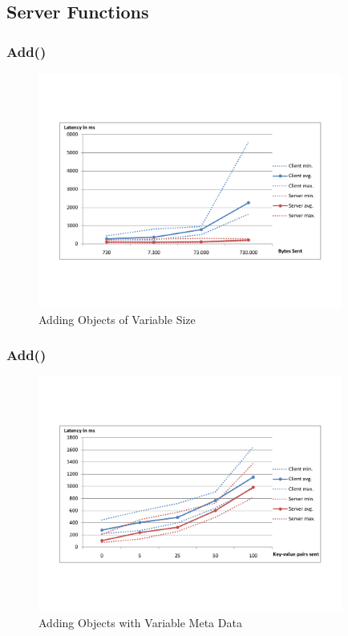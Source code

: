 \documentclass{beamer}
\begin{document}
\subsection{Server Functions}
\frame
{
	\frametitle{Add()}
	\begin{figure}[t]
	\begin{center}
	\includegraphics[trim = 0 5cm 0 5cm, width=10cm]{add_obj.pdf} 
	\caption{Adding Objects of Variable Size}
	\end{center}
	\end{figure}
}

\frame
{
	\frametitle{Add()}
	\begin{figure}[t]
	\begin{center}
	\includegraphics[trim = 0 5cm 0 5cm, width=10cm]{add_md.pdf} 
	\caption{Adding Objects with Variable Meta Data}
	\end{center}
	\end{figure}
}
\end{document}
